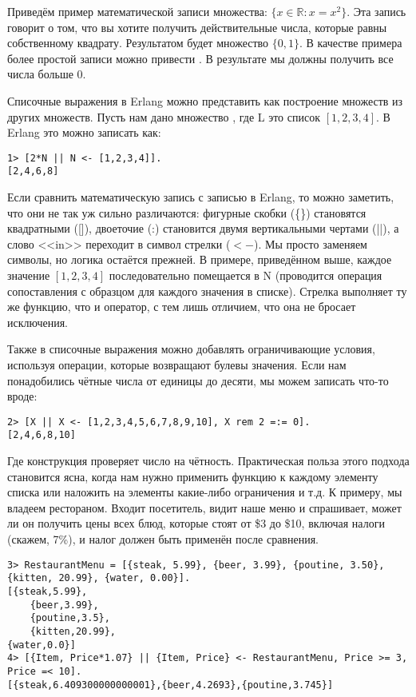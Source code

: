 Приведём пример математической записи множества: $\{x \in 
\mathbb{R}: x = x^2\}$.
Эта запись говорит о том, что вы хотите получить действительные числа, которые равны собственному квадрату.
Результатом будет множество $\{0, 1\}$.
В качестве примера более простой записи можно привести .
В результате мы должны получить все числа больше 0.

Списочные выражения в Erlang можно представить как построение множеств из других множеств.
Пусть нам дано множество , где L это список $[1, 2, 3, 4]$.
В Erlang это можно записать как:\\ 
\begin{lstlisting}[style=repl]
1> [2*N || N <- [1,2,3,4]].
[2,4,6,8]
\end{lstlisting}

Если сравнить математическую запись с записью в Erlang, то можно заметить, что они не так уж сильно различаются: фигурные скобки (\{\}) становятся квадратными ([]), двоеточие (:) становится двумя вертикальными чертами (||), а слово <<in>> переходит в символ стрелки ($<-$).
Мы просто заменяем символы, но логика остаётся прежней.
В примере, приведённом выше, каждое значение $[1, 2, 3, 4]$ последовательно помещается в N (проводится операция сопоставления с образцом для каждого значения в списке).
Стрелка выполняет ту же функцию, что и оператор\ops{=}, с тем лишь отличием, что она не бросает исключения.

Также в списочные выражения можно добавлять ограничивающие условия, используя операции, которые возвращают булевы значения.
Если нам понадобились чётные числа от единицы до десяти, мы можем записать что\--то вроде:
\begin{lstlisting}[style=repl]
2> [X || X <- [1,2,3,4,5,6,7,8,9,10], X rem 2 =:= 0].
[2,4,6,8,10]
\end{lstlisting}

Где конструкция  проверяет число на чётность.
Практическая польза этого подхода становится ясна, когда нам нужно применить функцию к каждому элементу списка или наложить на элементы какие\--либо ограничения и т.д.
К примеру, мы владеем рестораном.
Входит посетитель, видит наше меню и спрашивает, может ли он получить цены всех блюд, которые стоят от \$3 до \$10, включая налоги (скажем, 7\%), и налог должен быть применён после сравнения.
\begin{lstlisting}[style=repl]
3> RestaurantMenu = [{steak, 5.99}, {beer, 3.99}, {poutine, 3.50}, {kitten, 20.99}, {water, 0.00}].
[{steak,5.99},
    {beer,3.99},
    {poutine,3.5},
    {kitten,20.99},
{water,0.0}]
4> [{Item, Price*1.07} || {Item, Price} <- RestaurantMenu, Price >= 3, Price =< 10].
[{steak,6.409300000000001},{beer,4.2693},{poutine,3.745}]
\end{lstlisting}

